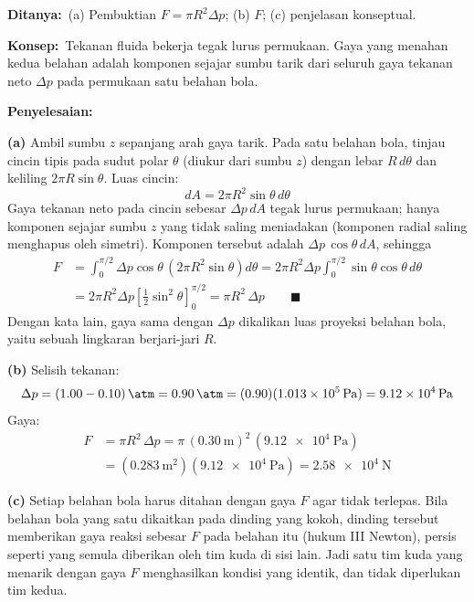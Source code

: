 \documentclass[12pt,a4paper]{article}
\newcommand{\ditanya}{\par\medskip\noindent\textbf{Ditanya:}}
\newcommand{\konsep}{\par\medskip\noindent\textbf{Konsep:}}
\newcommand{\penyelesaian}{\par\medskip\noindent\textbf{Penyelesaian:}\par\nopagebreak}
\begin{document}
\ditanya\ (a) Pembuktian $F = \pi R^2 \Delta p$; (b) $F$; (c) penjelasan konseptual.

\konsep\ Tekanan fluida bekerja tegak lurus permukaan. Gaya yang menahan kedua belahan
adalah komponen sejajar sumbu tarik dari seluruh gaya tekanan neto $\Delta p$ pada
permukaan satu belahan bola.

\penyelesaian

\textbf{(a)} Ambil sumbu $z$ sepanjang arah gaya tarik. Pada satu belahan bola, tinjau
cincin tipis pada sudut polar $\theta$ (diukur dari sumbu $z$) dengan lebar $R\,d\theta$
dan keliling $2\pi R\sin\theta$. Luas cincin:
\begin{equation}
dA = 2\pi R^2 \sin\theta \, d\theta
\end{equation}
Gaya tekanan neto pada cincin sebesar $\Delta p\,dA$ tegak lurus permukaan; hanya
komponen sejajar sumbu $z$ yang tidak saling meniadakan (komponen radial saling
menghapus oleh simetri). Komponen tersebut adalah $\Delta p\,\cos\theta\,dA$, sehingga
\begin{align}
F &= \int_{0}^{\pi/2} \Delta p \cos\theta \,\left(2\pi R^2 \sin\theta\right) d\theta
   = 2\pi R^2 \Delta p \int_{0}^{\pi/2} \sin\theta\cos\theta \, d\theta \\
  &= 2\pi R^2 \Delta p \left[\tfrac{1}{2}\sin^2\theta\right]_{0}^{\pi/2}
   = \pi R^2 \,\Delta p \qquad \blacksquare
\end{align}
Dengan kata lain, gaya sama dengan $\Delta p$ dikalikan luas proyeksi belahan bola, yaitu
sebuah lingkaran berjari-jari $R$.

\textbf{(b)} Selisih tekanan:
\begin{equation}
\Delta p = (\num{1,00} - \num{0,10})\,\si{\atm} = \SI{0,90}{\atm}
 = (\num{0,90})(\SI{1,013e5}{\pascal}) = \SI{9,12e4}{\pascal}
\end{equation}
Gaya:
\begin{align}
F &= \pi R^2 \,\Delta p = \pi\,(\SI{0,30}{\metre})^2\,(\SI{9,12e4}{\pascal}) \\
  &= (\SI{0,283}{\metre\squared})(\SI{9,12e4}{\pascal}) = \SI{2,58e4}{\newton}
\end{align}

\textbf{(c)} Setiap belahan bola harus ditahan dengan gaya $F$ agar tidak terlepas.
Bila belahan bola yang satu dikaitkan pada dinding yang kokoh, dinding tersebut
memberikan gaya reaksi sebesar $F$ pada belahan itu (hukum III Newton), persis seperti
yang semula diberikan oleh tim kuda di sisi lain. Jadi satu tim kuda yang menarik dengan
gaya $F$ menghasilkan kondisi yang identik, dan tidak diperlukan tim kedua.
\end{document}
